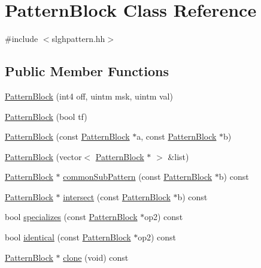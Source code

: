 \hypertarget{class_pattern_block}{}\section{Pattern\+Block Class Reference}
\label{class_pattern_block}


{\ttfamily \#include $<$slghpattern.\+hh$>$}

\subsection*{Public Member Functions}
\begin{DoxyCompactItemize}
\item 
\mbox{\hyperlink{class_pattern_block_ab0ed5919982064e8399c19997d8b7225}{Pattern\+Block}} (int4 off, uintm msk, uintm val)
\item 
\mbox{\hyperlink{class_pattern_block_ac5f1c4e4d7e4bffc1b326f789fe0f705}{Pattern\+Block}} (bool tf)
\item 
\mbox{\hyperlink{class_pattern_block_a98cfbb5cd643eac16ef1e7eb69a974da}{Pattern\+Block}} (const \mbox{\hyperlink{class_pattern_block}{Pattern\+Block}} $\ast$a, const \mbox{\hyperlink{class_pattern_block}{Pattern\+Block}} $\ast$b)
\item 
\mbox{\hyperlink{class_pattern_block_a32b31cc7039db67430b9a439cceb6cb8}{Pattern\+Block}} (vector$<$ \mbox{\hyperlink{class_pattern_block}{Pattern\+Block}} $\ast$ $>$ \&list)
\item 
\mbox{\hyperlink{class_pattern_block}{Pattern\+Block}} $\ast$ \mbox{\hyperlink{class_pattern_block_ae48d46851ac35befe0124e01966c377a}{common\+Sub\+Pattern}} (const \mbox{\hyperlink{class_pattern_block}{Pattern\+Block}} $\ast$b) const
\item 
\mbox{\hyperlink{class_pattern_block}{Pattern\+Block}} $\ast$ \mbox{\hyperlink{class_pattern_block_adc250100118cebc54285e1e3ea038fb3}{intersect}} (const \mbox{\hyperlink{class_pattern_block}{Pattern\+Block}} $\ast$b) const
\item 
bool \mbox{\hyperlink{class_pattern_block_aa98406ec9f84a2098fe9555c53f8db85}{specializes}} (const \mbox{\hyperlink{class_pattern_block}{Pattern\+Block}} $\ast$op2) const
\item 
bool \mbox{\hyperlink{class_pattern_block_aeeb525d6c26f61b7717a7b6c0092ae67}{identical}} (const \mbox{\hyperlink{class_pattern_block}{Pattern\+Block}} $\ast$op2) const
\item 
\mbox{\hyperlink{class_pattern_block}{Pattern\+Block}} $\ast$ \mbox{\hyperlink{class_pattern_block_a75532185fe8a7faafba4e12ba20438b2}{clone}} (void) const

\end{DoxyCompactItemize}
